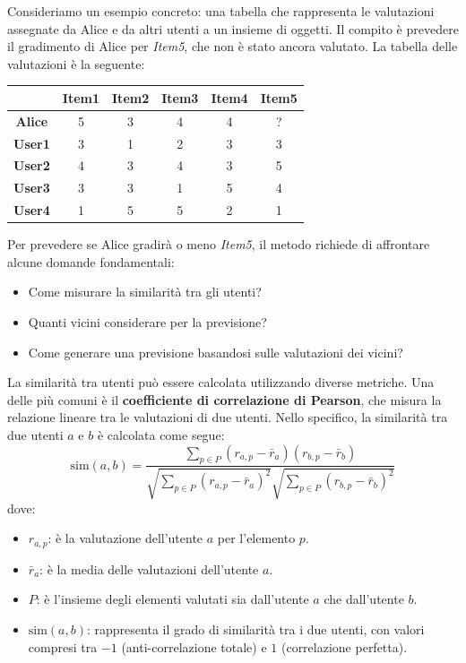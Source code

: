 \documentclass{report}
\begin{document}
	\begin{tcolorbox}[title=Esempio]
		Consideriamo un esempio concreto: una tabella che rappresenta le valutazioni assegnate da Alice e da altri utenti a un insieme di oggetti. Il compito è prevedere il gradimento di Alice per \textit{Item5}, che non è stato ancora valutato. La tabella delle valutazioni è la seguente:

		\begin{table}[H]
			\centering
			\begin{tabular}{|c|c|c|c|c|c|}
				\hline
				& \textbf{Item1} & \textbf{Item2} & \textbf{Item3} & \textbf{Item4} & \textbf{Item5} \\ \hline
				\textbf{Alice} & 5 & 3 & 4 & 4 & \color{red}? \\ \hline
				\textbf{User1} & 3 & 1 & 2 & 3 & 3 \\ \hline
				\textbf{User2} & 4 & 3 & 4 & 3 & 5 \\ \hline
				\textbf{User3} & 3 & 3 & 1 & 5 & 4 \\ \hline
				\textbf{User4} & 1 & 5 & 5 & 2 & 1 \\ \hline
			\end{tabular}
		\end{table}
	\end{tcolorbox}
	Per prevedere se Alice gradirà o meno \textit{Item5}, il metodo richiede di affrontare alcune domande fondamentali:
	\begin{itemize}
		\item Come misurare la similarità tra gli utenti?
		\item Quanti vicini considerare per la previsione?
		\item Come generare una previsione basandosi sulle valutazioni dei vicini?
	\end{itemize}
	La similarità tra utenti può essere calcolata utilizzando diverse metriche. Una delle più comuni è il \textbf{coefficiente di correlazione di Pearson}, che misura la relazione lineare tra le valutazioni di due utenti. Nello specifico, la similarità tra due utenti \(a\) e \(b\) è calcolata come segue:
	\[
	\text{sim}(a, b) = \frac{\sum_{p \in P} (r_{a,p} - \bar{r}_a)(r_{b,p} - \bar{r}_b)}{\sqrt{\sum_{p \in P} (r_{a,p} - \bar{r}_a)^2} \sqrt{\sum_{p \in P} (r_{b,p} - \bar{r}_b)^2}}
	\]
	dove:
	\begin{itemize}
		\item \(r_{a,p}\): è la valutazione dell'utente \(a\) per l'elemento \(p\).
		\item \(\bar{r}_a\): è la media delle valutazioni dell'utente \(a\).
		\item \(P\): è l'insieme degli elementi valutati sia dall'utente \(a\) che dall'utente \(b\).
		\item \(\text{sim}(a, b)\): rappresenta il grado di similarità tra i due utenti, con valori compresi tra \(-1\) (anti-correlazione totale) e \(1\) (correlazione perfetta).
	\end{itemize}
\end{document}
